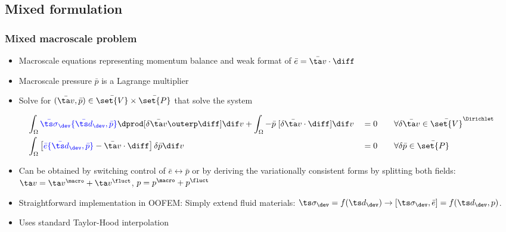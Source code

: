 \documentclass[11pt]{beamer} %
\begin{document}
\subsection{Mixed formulation}
\begin{frame}
 \frametitle{Mixed macroscale problem}
\begin{itemize}
 \item Macroscale equations representing momentum balance and weak format of $\bar{e} = \bar{\ta v}\cdot\diff$
 \item Macroscale pressure $\bar{p}$ is a Lagrange multiplier
 \item Solve for $(\bar{\ta v}, \bar{p}) \in \bar{\set{V}}\times\bar{\set{P}}$ that solve the system
\end{itemize}
\begin{alignat*}{3}
 &\int_\Omega {\color{blue}\bar{\ts\sigma}_\dev\{\bar{\ts d}_\dev,\bar{p}\}} \dprod [\delta\bar{\ta v}\outerp \diff] \dif v + \int_\Omega -\bar{p}\;[\delta\bar{\ta v}\cdot\diff]\dif v &&= 0 &\quad& \forall \delta\bar{\ta v}\in \bar{\set{V}}^\Dirichlet\\
 &\int_\Omega \left[ {\color{blue}\bar{e}\{\bar{\ts d}_\dev,\bar{p}\}} - \bar{\ta v}\cdot\diff\right]\delta\bar{p} \dif v &&= 0&\quad& \forall \delta\bar{p}\in \bar{\set{P}}
\end{alignat*}
\begin{itemize}
 \item Can be obtained by switching control of $\bar{e} \leftrightarrow \bar{p}$ or by deriving the variationally consistent forms by splitting both fields:\\ $\ta v = \ta v^\macro + \ta v^\fluct$, $p = p^\macro + p^\fluct$
 \item Straightforward implementation in OOFEM: Simply extend fluid materials: $\ts\sigma_\dev = f(\ts d_\dev) \rightarrow [\ts\sigma_\dev,\bar{e}] = f(\ts d_\dev, p)$.
 \item Uses standard Taylor-Hood interpolation
\end{itemize}


\end{frame}
\end{document}
